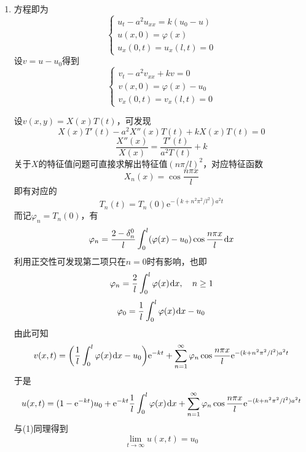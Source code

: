 \documentclass[a4paper,UTF8,fontset=windows,10pt]{ctexart}
\newcommand*{\dr}{\hspace{0.07em}\mathrm{d}}
\newcommand*{\er}{\mathrm{e}}
\begin{document}
\begin{enumerate}
\begin{enumerate}[(1)]
        \item 方程即为
        $$\begin{cases}u_t-a^2u_{xx}=k(u_0-u)\\u(x,0)=\varphi(x)\\u_x(0,t)=u_x(l,t)=0\end{cases}$$
        设$v=u-u_0$得到
        $$\begin{cases}v_t-a^2v_{xx}+kv=0\\v(x,0)=\varphi(x)-u_0\\v_x(0,t)=v_x(l,t)=0\end{cases}$$
    
        设$v(x,y)=X(x)T(t)$，可发现
        $$X(x)T'(t)-a^2X''(x)T(t)+kX(x)T(t)=0$$
        $$\frac{X''(x)}{X(x)}=\frac{T'(t)}{a^2T(t)}+k$$
        关于$X$的特征值问题可直接求解出特征值$(n\pi/l)^2$，对应特征函数
        $$X_n(x)=\cos\frac{n\pi x}{l}$$
        即有对应的
        $$T_n(t)=T_n(0)\er^{-(k+n^2\pi^2/l^2)a^2t}$$
        而记$\varphi_n=T_n(0)$，有
        $$\varphi_n=\frac{2-\delta_n^0}{l}\int_0^l(\varphi(x)-u_0)\cos\frac{n\pi x}{l}\dr x$$
        利用正交性可发现第二项只在$n=0$时有影响，也即
        $$\varphi_n=\frac{2}{l}\int_0^l\varphi(x)\dr x,\quad n\ge1$$
        $$\varphi_0=\frac{1}{l}\int_0^l\varphi(x)\dr x-u_0$$
        由此可知
        $$v(x,t)=\bigg(\frac{1}{l}\int_0^l\varphi(x)\dr x-u_0\bigg)\er^{-kt}+\sum_{n=1}^\infty\varphi_n\cos\frac{n\pi x}{l}\er^{-(k+n^2\pi^2/l^2)a^2t}$$
        于是
        $$u(x,t)=(1-\er^{-kt})u_0+\er^{-kt}\frac{1}{l}\int_0^l\varphi(x)\dr x+\sum_{n=1}^\infty\varphi_n\cos\frac{n\pi x}{l}\er^{-(k+n^2\pi^2/l^2)a^2t}$$
        与(1)同理得到
        $$\lim_{t\to\infty}u(x,t)=u_0$$
    \end{enumerate}
\end{enumerate}
\end{document}
